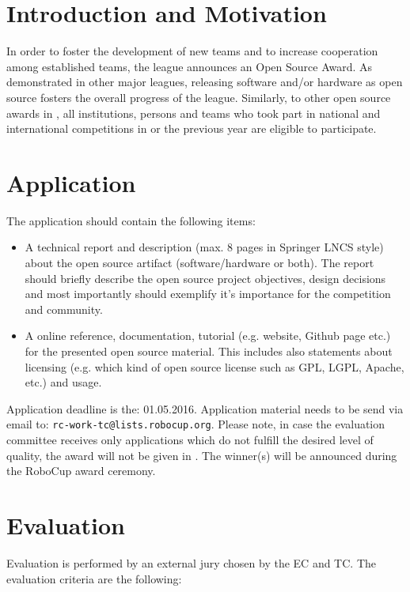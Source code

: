 \section{Introduction and Motivation}


In order to foster the development of new teams and to increase cooperation among established teams, the league announces an Open Source Award. As demonstrated
in other \RC major leagues, releasing software and/or hardware as open source fosters the overall progress of the league. Similarly, to other open source awards in \RC, all institutions, persons and teams who took part in national and international \RCAW competitions in \YEAR or the previous year are eligible to participate. 

\section{Application}
The application should contain the following items: 

\begin{itemize}
	\item A technical report and description (max. 8 pages in Springer LNCS style) about the open source artifact (software/hardware or both). The report should briefly describe the open source project objectives, design decisions and most importantly should exemplify it's importance for the \RCAW competition and community.   
	\item A online reference, documentation, tutorial (e.g. website, Github page etc.) for the presented open source material. This includes also statements about licensing (e.g. which kind of open source license such as GPL, LGPL, Apache, etc.) and usage.  
\end{itemize}

Application deadline is the: 01.05.2016. Application material needs to be send via email to: \texttt{rc-work-tc@lists.robocup.org}. Please note, in case the evaluation committee receives  only applications which do not fulfill the desired level of quality, the award will not be given in \YEAR. The winner(s) will be announced during the RoboCup \YEAR award ceremony. 


\section{Evaluation}
Evaluation is performed by an external jury chosen by the EC and TC. The evaluation criteria are the following:

